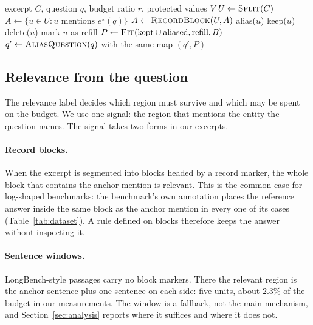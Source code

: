 \begin{algorithm}[t]
\caption{\textsc{DARK} prompt construction}
\label{alg:dark}
\begin{algorithmic}[1]
\Require excerpt $C$, question $q$, budget ratio $r$, protected values $V$
\State $U \gets \textsc{Split}(C)$
\State $A \gets \{u \in U : u \text{ mentions } e^\star(q)\}$
\State $A \gets \textsc{RecordBlock}(U, A)$ 
      \State alias($u$) 
     \Else{} \State keep($u$) 
     \EndIf
     \State delete($u$) 
  \Else{} \State mark $u$ as refill
  \EndIf
\EndFor
\State $P \gets \textsc{Fit}(\text{kept} \cup \text{aliased}, \text{refill}, B)$
\State $q' \gets \textsc{AliasQuestion}(q)$ with the same map
\State \Return $(q', P)$
\end{algorithmic}
\end{algorithm}

\subsection{Relevance from the question}

The relevance label decides which region must survive and which may be spent on the budget.
We use one signal: the region that mentions the entity the question names.
The signal takes two forms in our excerpts.

\paragraph{Record blocks.}
When the excerpt is segmented into blocks headed by a record marker, the whole block that
contains the anchor mention is relevant. This is the common case for log-shaped benchmarks: the
benchmark's own annotation places the reference answer inside the same block as the anchor
mention in every one of its cases (Table~\ref{tab:dataset}). A rule defined on blocks therefore keeps the answer
without inspecting it.

\paragraph{Sentence windows.}
LongBench-style passages carry no block markers. There the relevant region is the anchor
sentence plus one sentence on each side: five units, about $2.3\%$ of the budget in our
measurements. The window is a fallback, not the main mechanism, and
Section~\ref{sec:analysis} reports where it suffices and where it does not.

